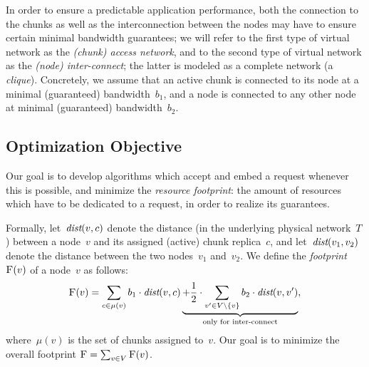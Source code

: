 \documentclass[preprint,12pt]{elsarticle}
\newcommand{\stefan}[1]{\textcolor{blue}{stefan: #1}}
\newcommand{\VirtualNodes}{\ensuremath{V}}
\newcommand{\achunk}{\ensuremath{c}}
\newcommand{\dist}{\emph{dist}}
\newcommand{\Cost}{\textsc{F}}
\newcommand{\Tree}{\ensuremath{T}}
\newcommand{\CostTrans}{\ensuremath{b_1}}
\newcommand{\CostCom}{\ensuremath{b_2}}
\begin{document}
In order to ensure a predictable application performance, both the connection to the chunks
as well as the interconnection between the nodes may have to ensure certain
minimal bandwidth guarantees; we will refer to the first type of virtual network as the \emph{(chunk) access
network}, and to the second type of virtual network as the \emph{(node) inter-connect}; the latter
is modeled as a complete network (a \emph{clique}). Concretely, we assume that an  active chunk
is connected to its node at a minimal (guaranteed) bandwidth~$\CostTrans$, and a node is connected to any other node
at minimal (guaranteed) bandwidth~$\CostCom$.




\subsection{Optimization Objective}

Our goal is to develop algorithms which 
accept and embed a request
whenever this is possible, and minimize the \emph{resource footprint}: the amount of resources which have to be dedicated to a request, in order to realize its guarantees.

Formally, let~$\dist(v,\achunk)$ denote the distance (in the underlying physical network~$\Tree$) between a node~$v$ and
its assigned (active) chunk replica~$\achunk$, and let~$\dist(v_1,v_2)$ denote the distance between the two nodes~$v_1$ and~$v_2$.
We define the \emph{footprint}~$\Cost(v)$ of a node~$v$ as follows:
$$
\Cost(v) = \sum_{\achunk\in \mu(v)} \CostTrans \cdot \dist(v,\achunk) \underbrace{+ \frac{1}{2} \cdot \sum_{v' \in \VirtualNodes\setminus\{v\}} \CostCom \cdot \dist(v,v')}_{\text{only for inter-connect}},
$$
 where~$\mu(v)$ is the set of chunks assigned to~$v$. Our goal is to minimize the overall footprint
$\Cost=\sum_{v\in V} \Cost(v)$.
\end{document}
